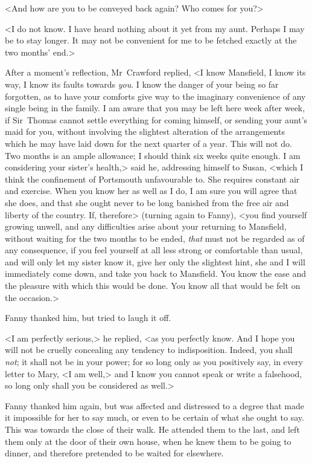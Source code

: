 <And how are you to be conveyed back again? Who comes for you?>

<I do not know. I have heard nothing about it yet from my aunt. Perhaps I may be to stay longer. It may not be convenient for me to be fetched exactly at the two months' end.>

After a moment's reflection, Mr~Crawford replied, <I know Mansfield, I know its way, I know its faults towards \textit{you}. I know the danger of your being so far forgotten, as to have your comforts give way to the imaginary convenience of any single being in the family. I am aware that you may be left here week after week, if Sir~Thomas cannot settle everything for coming himself, or sending your aunt's maid for you, without involving the slightest alteration of the arrangements which he may have laid down for the next quarter of a year. This will not do. Two months is an ample allowance; I should think six weeks quite enough. I am considering your sister's health,> said he, addressing himself to Susan, <which I think the confinement of Portsmouth unfavourable to. She requires constant air and exercise. When you know her as well as I do, I am sure you will agree that she does, and that she ought never to be long banished from the free air and liberty of the country. If, therefore> (turning again to Fanny), <you find yourself growing unwell, and any difficulties arise about your returning to Mansfield, without waiting for the two months to be ended, \textit{that}  must not be regarded as of any consequence, if you feel yourself at all less strong or comfortable than usual, and will only let my sister know it, give her only the slightest hint, she and I will immediately come down, and take you back to Mansfield. You know the ease and the pleasure with which this would be done. You know all that would be felt on the occasion.>

Fanny thanked him, but tried to laugh it off.

<I am perfectly serious,> he replied, <as you perfectly know. And I hope you will not be cruelly concealing any tendency to indisposition. Indeed, you shall \textit{not}; it shall not be in your power; for so long only as you positively say, in every letter to Mary, <I am well,> and I know you cannot speak or write a falsehood, so long only shall you be considered as well.>

Fanny thanked him again, but was affected and distressed to a degree that made it impossible for her to say much, or even to be certain of what she ought to say. This was towards the close of their walk. He attended them to the last, and left them only at the door of their own house, when he knew them to be going to dinner, and therefore pretended to be waited for elsewhere.

